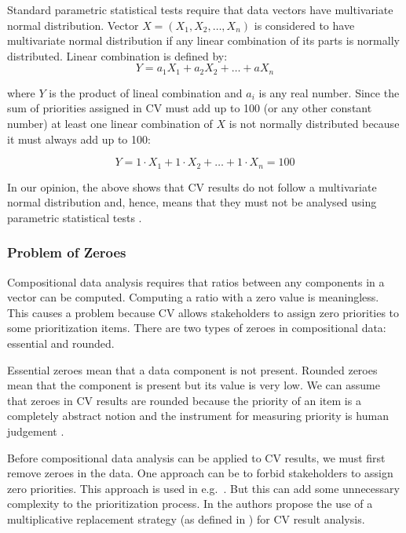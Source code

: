 Standard parametric statistical tests require that data vectors have
multivariate normal distribution. Vector $X=(X_{1}, X_{2}, \ldots, X_{n})$
is considered to have multivariate normal distribution if any linear
combination of its parts is normally distributed. Linear combination
is defined by:
\begin{equation}
	Y=a_{1}X_{1}+a_{2}X_{2}+\ldots+aX_{n}
\end{equation}

where $Y$ is the product of lineal combination and $a_{i}$ is any
real number. Since the sum of priorities assigned in CV must add up
to 100 (or any other constant number) at least one linear combination
of $X$ is not normally distributed because it must always add up to
100:

\begin{equation}
	Y=1\cdot X_{1}+1\cdot X_{2}+\ldots+1\cdot X_{n}=100
\end{equation}

In our opinion, the above shows that CV results do not follow a multivariate normal distribution and, hence, means that they must not be analysed using parametric statistical tests \citep{Pawlowsky-Glahn2006}.


\subsubsection{\label{Problem-of-Zeroes}Problem of Zeroes}

Compositional data analysis requires that ratios between any components in a vector can be
computed. Computing a ratio with a zero value is meaningless. This causes
a problem because CV allows stakeholders to assign zero priorities
to some prioritization items. There are two types of zeroes in compositional
data: essential and rounded.

Essential zeroes mean that a data component
is not present. Rounded zeroes mean that the component is present but
its value is very low. We can assume that zeroes in CV results are
rounded because the priority of an item is a completely abstract notion
and the instrument for measuring priority is human judgement \citep{Chatzipetrou2010}.

Before compositional data analysis can be applied to CV results, we must first remove
zeroes in the data. One approach can be to forbid stakeholders
to assign zero priorities. This approach is used in e.g.\ \citep{Pettersson2008}.
But this can add some unnecessary complexity to the prioritization
process. In \citep{Chatzipetrou2010} the authors propose the use of a multiplicative replacement
strategy (as defined in \citep{Martin-Fernandez2003}) for CV result analysis.

